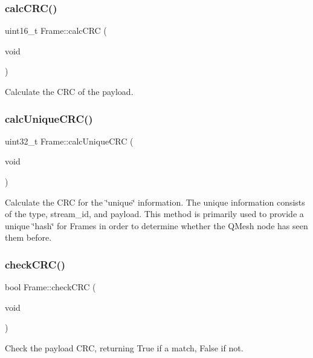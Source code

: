 \subsubsection{\texorpdfstring{calc\+C\+R\+C()}{calcCRC()}}
{\footnotesize\ttfamily uint16\+\_\+t Frame\+::calc\+C\+RC (\begin{DoxyParamCaption}\item[{void}]{ }\end{DoxyParamCaption})}

Calculate the C\+RC of the payload. \mbox{\label{classFrame_a690b8728c8215af874f0aed2c643d7a6}} 
\subsubsection{\texorpdfstring{calc\+Unique\+C\+R\+C()}{calcUniqueCRC()}}
{\footnotesize\ttfamily uint32\+\_\+t Frame\+::calc\+Unique\+C\+RC (\begin{DoxyParamCaption}\item[{void}]{ }\end{DoxyParamCaption})}

Calculate the C\+RC for the \char`\"{}unique\char`\"{} information. The unique information consists of the type, stream\+\_\+id, and payload. This method is primarily used to provide a unique \char`\"{}hash\char`\"{} for Frames in order to determine whether the Q\+Mesh node has seen them before. \mbox{\label{classFrame_a99bf5c1a41572292c07bc9699a491a96}} 
\subsubsection{\texorpdfstring{check\+C\+R\+C()}{checkCRC()}}
{\footnotesize\ttfamily bool Frame\+::check\+C\+RC (\begin{DoxyParamCaption}\item[{void}]{ }\end{DoxyParamCaption})\hspace{0.3cm}{\ttfamily [inline]}}

Check the payload C\+RC, returning True if a match, False if not. \mbox{\label{classFrame_a14c155e1ec94aa20bec722efaff3b25d}} 
